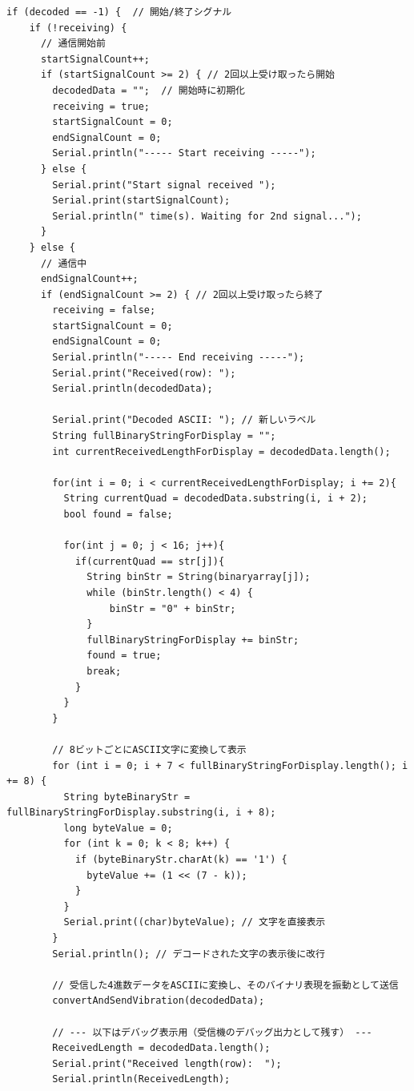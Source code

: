 \begin{lstlisting}[caption=vibration\_tx\_itg.ino]
  if (decoded == -1) {  // 開始/終了シグナル
    if (!receiving) {
      // 通信開始前
      startSignalCount++;
      if (startSignalCount >= 2) { // 2回以上受け取ったら開始
        decodedData = "";  // 開始時に初期化
        receiving = true;
        startSignalCount = 0;
        endSignalCount = 0;
        Serial.println("----- Start receiving -----");
      } else {
        Serial.print("Start signal received ");
        Serial.print(startSignalCount);
        Serial.println(" time(s). Waiting for 2nd signal...");
      }
    } else {
      // 通信中
      endSignalCount++;
      if (endSignalCount >= 2) { // 2回以上受け取ったら終了
        receiving = false;
        startSignalCount = 0;
        endSignalCount = 0;
        Serial.println("----- End receiving -----");
        Serial.print("Received(row): ");
        Serial.println(decodedData);

        Serial.print("Decoded ASCII: "); // 新しいラベル
        String fullBinaryStringForDisplay = "";
        int currentReceivedLengthForDisplay = decodedData.length();

        for(int i = 0; i < currentReceivedLengthForDisplay; i += 2){
          String currentQuad = decodedData.substring(i, i + 2);
          bool found = false;

          for(int j = 0; j < 16; j++){
            if(currentQuad == str[j]){
              String binStr = String(binaryarray[j]);
              while (binStr.length() < 4) {
                  binStr = "0" + binStr;
              }
              fullBinaryStringForDisplay += binStr;
              found = true;
              break;
            }
          }
        }

        // 8ビットごとにASCII文字に変換して表示
        for (int i = 0; i + 7 < fullBinaryStringForDisplay.length(); i += 8) {
          String byteBinaryStr = fullBinaryStringForDisplay.substring(i, i + 8);
          long byteValue = 0;
          for (int k = 0; k < 8; k++) {
            if (byteBinaryStr.charAt(k) == '1') {
              byteValue += (1 << (7 - k));
            }
          }
          Serial.print((char)byteValue); // 文字を直接表示
        }
        Serial.println(); // デコードされた文字の表示後に改行

        // 受信した4進数データをASCIIに変換し、そのバイナリ表現を振動として送信
        convertAndSendVibration(decodedData);
        
        // --- 以下はデバッグ表示用（受信機のデバッグ出力として残す） ---
        ReceivedLength = decodedData.length();
        Serial.print("Received length(row):  ");
        Serial.println(ReceivedLength);


\end{lstlisting}
